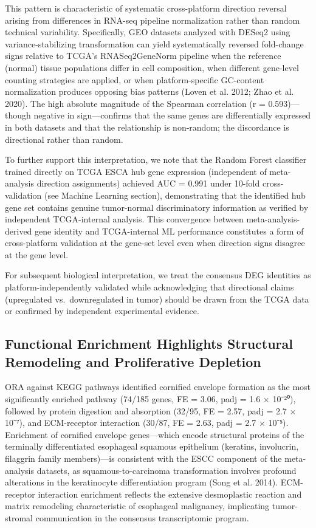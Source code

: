 \documentclass[
  12pt,
]{article}
\begin{document}
This pattern is characteristic of systematic cross-platform direction
reversal arising from differences in RNA-seq pipeline normalization
rather than random technical variability. Specifically, GEO datasets
analyzed with DESeq2 using variance-stabilizing transformation can yield
systematically reversed fold-change signs relative to TCGA's
RNASeq2GeneNorm pipeline when the reference (normal) tissue populations
differ in cell composition, when different gene-level counting
strategies are applied, or when platform-specific GC-content
normalization produces opposing bias patterns (Loven et al. 2012; Zhao
et al. 2020). The high absolute magnitude of the Spearman correlation
(\textbar r\textbar{} = 0.593)---though negative in sign---confirms that
the same genes are differentially expressed in both datasets and that
the relationship is non-random; the discordance is directional rather
than random.

To further support this interpretation, we note that the Random Forest
classifier trained directly on TCGA ESCA hub gene expression
(independent of meta-analysis direction assignments) achieved AUC =
0.991 under 10-fold cross-validation (see Machine Learning section),
demonstrating that the identified hub gene set contains genuine
tumor-normal discriminatory information as verified by independent
TCGA-internal analysis. This convergence between meta-analysis-derived
gene identity and TCGA-internal ML performance constitutes a form of
cross-platform validation at the gene-set level even when direction
signs disagree at the gene level.

For subsequent biological interpretation, we treat the consensus DEG
identities as platform-independently validated while acknowledging that
directional claims (upregulated vs.~downregulated in tumor) should be
drawn from the TCGA data or confirmed by independent experimental
evidence.

\subsection{Functional Enrichment Highlights Structural Remodeling and
Proliferative
Depletion}\label{functional-enrichment-highlights-structural-remodeling-and-proliferative-depletion}

ORA against KEGG pathways identified cornified envelope formation as the
most significantly enriched pathway (74/185 genes, FE = 3.06, padj = 1.6
× 10⁻²⁰), followed by protein digestion and absorption (32/95, FE =
2.57, padj = 2.7 × 10⁻⁷), and ECM-receptor interaction (30/87, FE =
2.63, padj = 2.7 × 10⁻⁵). Enrichment of cornified envelope genes---which
encode structural proteins of the terminally differentiated esophageal
squamous epithelium (keratins, involucrin, filaggrin family
members)---is consistent with the ESCC component of the meta-analysis
datasets, as squamous-to-carcinoma transformation involves profound
alterations in the keratinocyte differentiation program (Song et al.
2014). ECM-receptor interaction enrichment reflects the extensive
desmoplastic reaction and matrix remodeling characteristic of esophageal
malignancy, implicating tumor-stromal communication in the consensus
transcriptomic program.
\end{document}
